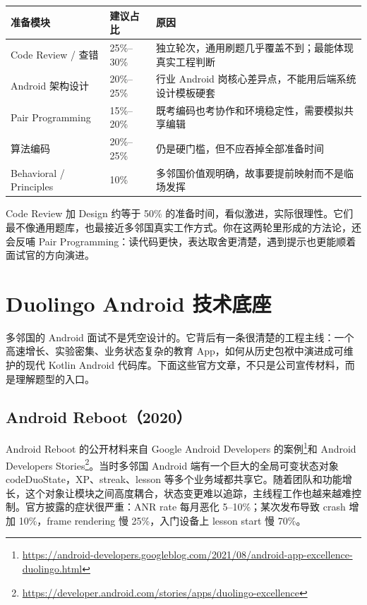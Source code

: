 \begin{center}
\begin{tabularx}{\linewidth}{@{}l l X@{}}
\toprule
\textbf{准备模块} & \textbf{建议占比} & \textbf{原因} \\
\midrule
Code Review / 查错 & 25\%--30\% & 独立轮次，通用刷题几乎覆盖不到；最能体现真实工程判断 \\
Android 架构设计 & 20\%--25\% & 行业 Android 岗核心差异点，不能用后端系统设计模板硬套 \\
Pair Programming & 15\%--20\% & 既考编码也考协作和环境稳定性，需要模拟共享编辑 \\
算法编码 & 20\%--25\% & 仍是硬门槛，但不应吞掉全部准备时间 \\
Behavioral / Principles & 10\% & 多邻国价值观明确，故事要提前映射而不是临场发挥 \\
\bottomrule
\end{tabularx}
\end{center}

\begin{idea}[把一半时间投给最不通用的两轮]
Code Review 加 Design 约等于 50\% 的准备时间，看似激进，实际很理性。它们最不像通用题库，也最接近多邻国真实工作方式。你在这两轮里形成的方法论，还会反哺 Pair Programming：读代码更快，表达取舍更清楚，遇到提示也更能顺着面试官的方向演进。
\end{idea}

\section{Duolingo Android 技术底座}

多邻国的 Android 面试不是凭空设计的。它背后有一条很清楚的工程主线：一个高速增长、实验密集、业务状态复杂的教育 App，如何从历史包袱中演进成可维护的现代 Kotlin Android 代码库。下面这些官方文章，不只是公司宣传材料，而是理解题型的入口。

\subsection{Android Reboot（2020）}

\srcofficial Android Reboot 的公开材料来自 Google Android Developers 的案例\footnote{\url{https://android-developers.googleblog.com/2021/08/android-app-excellence-duolingo.html}}和 Android Developers Stories\footnote{\url{https://developer.android.com/stories/apps/duolingo-excellence}}。当时多邻国 Android 端有一个巨大的全局可变状态对象 \\code{DuoState}，XP、streak、lesson 等多个业务域都共享它。随着团队和功能增长，这个对象让模块之间高度耦合，状态变更难以追踪，主线程工作也越来越难控制。官方披露的症状很严重：ANR rate 每月恶化 5--10\%；某次发布导致 crash 增加 10\%，frame rendering 慢 25\%，入门设备上 lesson start 慢 70\%。

